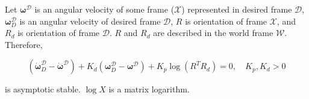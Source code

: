 \begin{theorem}
    Let $\boldsymbol{\omega}^{\mathcal{D}}$ is an angular velocity of 
    some frame ($\mathcal{X}$) represented in desired frame $\mathcal{D}$, 
    $\boldsymbol{\omega}_D^{\mathcal{D}}$ is an angular velocity of 
    desired frame $\mathcal{D}$, $R$ is orientation of frame $\mathcal{X}$, and 
    $R_d$ is orientation of frame $\mathcal{D}$. $R$ and $R_d$ are described in 
    the world frame $\mathcal{W}$. Therefore, 

    \begin{equation}
        (
            \dot{\boldsymbol{\omega}}_D^{\mathcal{D}} - 
            \dot{\boldsymbol{\omega}}^{\mathcal{D}}
        )
        + K_d 
        (
            \boldsymbol{\omega}_D^{\mathcal{D}} - 
            \boldsymbol{\omega}^{\mathcal{D}}
        )
        + K_p 
        \log (R^T R_d) = 0, \quad
        K_p, K_d > 0
        \label{eqn:stab_theorem_dif_eqn}
    \end{equation}

    is asymptotic stable. $\log X$ is a matrix logarithm.

    \label{th:stability_theorem}
\end{theorem}

